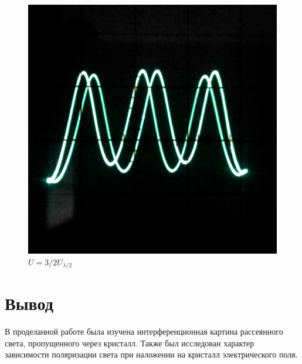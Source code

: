 \documentclass[a4paper,12pt]{article}
\begin{document}
\begin{figure}[h!]
\begin{center}
\begin{minipage}{0.3\textwidth}
					\caption{$U = 2U_{\lambda/2}$}
				\end{minipage}
				\hfill
				\begin{minipage}{0.3\textwidth}
					\includegraphics[width=\textwidth]{three}
					\caption{$U = 3/2U_{\lambda/2}$}
				\end{minipage}
			\end{center}
		\end{figure}
		
		\section{Вывод}
		
		В проделанной работе была изучена интерференционная картина рассеянного света, пропущенного через кристалл. Также был исследован характер зависимости поляризации света при наложении на кристалл электрического поля.
	

	
\end{document}
